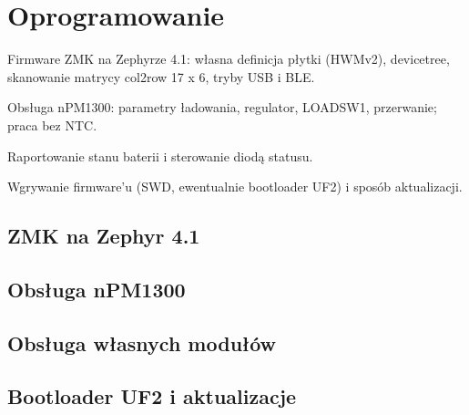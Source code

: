 \chapter{Oprogramowanie}\label{ch:firmware}
\begin{zawartosc}
  \item Firmware ZMK na Zephyrze 4.1: własna definicja płytki (HWMv2), devicetree, skanowanie matrycy col2row 17 x 6, tryby USB i BLE.
  \item Obsługa nPM1300: parametry ładowania, regulator, LOADSW1, przerwanie; praca bez NTC.
  \item Raportowanie stanu baterii i sterowanie diodą statusu.
  \item Wgrywanie firmware'u (SWD, ewentualnie bootloader UF2) i sposób aktualizacji.
\end{zawartosc}

\section{ZMK na Zephyr 4.1}\label{sec:zmk}

\section{Obsługa nPM1300}\label{sec:fwpmic}

\section{Obsługa własnych modułów}\label{sec:moduly}

\section{Bootloader UF2 i aktualizacje}\label{sec:uf2}

